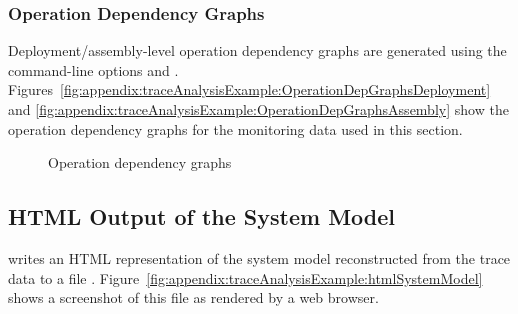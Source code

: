 \subsubsection{Operation Dependency Graphs}

Deployment/assembly-level operation dependency graphs are generated using the %
command-line options \OPT{\OPTplotDeploymentOperationDependencyGraph} and %
\OPT{\OPTplotAssemblyOperationDependencyGraph}. %
Figures~\ref{fig:appendix:traceAnalysisExample:OperationDepGraphsDeployment} and %
\ref{fig:appendix:traceAnalysisExample:OperationDepGraphsAssembly} show the %
operation dependency graphs for the monitoring data used in this section. 

\begin{figure}[ht]\centering
{}
\caption{Operation dependency graphs}
\label{fig:appendix:traceAnalysisExample:OperationDepGraphs}
\end{figure}

\subsection{HTML Output of the System Model}

\KiekerTraceAnalysis{} writes an HTML representation of the system model reconstructed %
from the trace data to a file . %
Figure~\ref{fig:appendix:traceAnalysisExample:htmlSystemModel} shows a screenshot %
of this file as rendered by a web browser.

